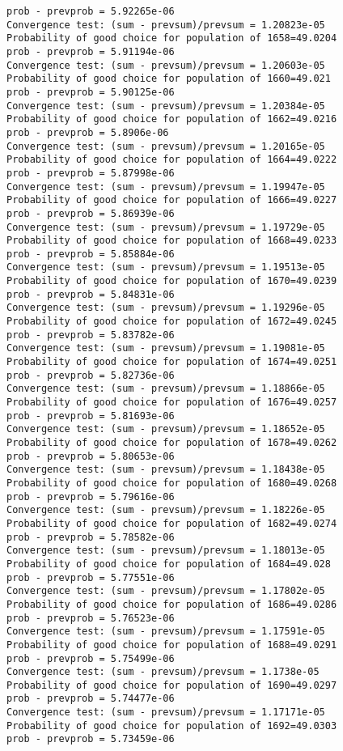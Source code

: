 \documentclass[11pt,onecolumn]{article}
\begin{document}
\begin{verbatim}
prob - prevprob = 5.92265e-06
Convergence test: (sum - prevsum)/prevsum = 1.20823e-05
Probability of good choice for population of 1658=49.0204
prob - prevprob = 5.91194e-06
Convergence test: (sum - prevsum)/prevsum = 1.20603e-05
Probability of good choice for population of 1660=49.021
prob - prevprob = 5.90125e-06
Convergence test: (sum - prevsum)/prevsum = 1.20384e-05
Probability of good choice for population of 1662=49.0216
prob - prevprob = 5.8906e-06
Convergence test: (sum - prevsum)/prevsum = 1.20165e-05
Probability of good choice for population of 1664=49.0222
prob - prevprob = 5.87998e-06
Convergence test: (sum - prevsum)/prevsum = 1.19947e-05
Probability of good choice for population of 1666=49.0227
prob - prevprob = 5.86939e-06
Convergence test: (sum - prevsum)/prevsum = 1.19729e-05
Probability of good choice for population of 1668=49.0233
prob - prevprob = 5.85884e-06
Convergence test: (sum - prevsum)/prevsum = 1.19513e-05
Probability of good choice for population of 1670=49.0239
prob - prevprob = 5.84831e-06
Convergence test: (sum - prevsum)/prevsum = 1.19296e-05
Probability of good choice for population of 1672=49.0245
prob - prevprob = 5.83782e-06
Convergence test: (sum - prevsum)/prevsum = 1.19081e-05
Probability of good choice for population of 1674=49.0251
prob - prevprob = 5.82736e-06
Convergence test: (sum - prevsum)/prevsum = 1.18866e-05
Probability of good choice for population of 1676=49.0257
prob - prevprob = 5.81693e-06
Convergence test: (sum - prevsum)/prevsum = 1.18652e-05
Probability of good choice for population of 1678=49.0262
prob - prevprob = 5.80653e-06
Convergence test: (sum - prevsum)/prevsum = 1.18438e-05
Probability of good choice for population of 1680=49.0268
prob - prevprob = 5.79616e-06
Convergence test: (sum - prevsum)/prevsum = 1.18226e-05
Probability of good choice for population of 1682=49.0274
prob - prevprob = 5.78582e-06
Convergence test: (sum - prevsum)/prevsum = 1.18013e-05
Probability of good choice for population of 1684=49.028
prob - prevprob = 5.77551e-06
Convergence test: (sum - prevsum)/prevsum = 1.17802e-05
Probability of good choice for population of 1686=49.0286
prob - prevprob = 5.76523e-06
Convergence test: (sum - prevsum)/prevsum = 1.17591e-05
Probability of good choice for population of 1688=49.0291
prob - prevprob = 5.75499e-06
Convergence test: (sum - prevsum)/prevsum = 1.1738e-05
Probability of good choice for population of 1690=49.0297
prob - prevprob = 5.74477e-06
Convergence test: (sum - prevsum)/prevsum = 1.17171e-05
Probability of good choice for population of 1692=49.0303
prob - prevprob = 5.73459e-06

\end{verbatim}
\end{document}
